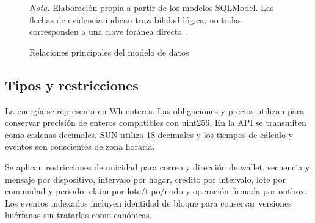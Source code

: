 \begin{figure}[htbp]
\caption{Relaciones principales del modelo de datos}\label{fig:datos}

\centering
{}
\par\noindent\small\textit{Nota.} Elaboración propia a partir de los modelos SQLModel. Las flechas de evidencia indican trazabilidad lógica; no todas corresponden a una clave foránea directa \citep{models}.

\end{figure}

\subsection{Tipos y restricciones}
La energía se representa en Wh enteros. Las obligaciones y precios utilizan  para conservar precisión de enteros compatibles con uint256. En la API se transmiten como cadenas decimales. SUN utiliza 18 decimales y los tiempos de cálculo y eventos son conscientes de zona horaria.

Se aplican restricciones de unicidad para correo y dirección de wallet, secuencia y mensaje por dispositivo, intervalo por hogar, crédito por intervalo, lote por comunidad y periodo, claim por lote/tipo/nodo y operación firmada por outbox. Los eventos indexados incluyen identidad de bloque para conservar versiones huérfanas sin tratarlas como canónicas.

